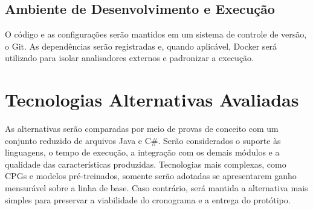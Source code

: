 \subsection{Ambiente de Desenvolvimento e Execução}

O código e as configurações serão mantidos em um sistema de controle de
versão, o Git. As dependências serão registradas e, quando aplicável, Docker será
utilizado para isolar analisadores externos e padronizar a execução.

\section{Tecnologias Alternativas Avaliadas}

As alternativas serão comparadas por meio de provas de conceito com um
conjunto reduzido de arquivos Java e C\#. Serão considerados o suporte às
linguagens, o tempo de execução, a integração com os demais módulos e a
qualidade das características produzidas. Tecnologias mais complexas, como CPGs e modelos pré-treinados, somente
serão adotadas se apresentarem ganho mensurável sobre a linha de base. Caso
contrário, será mantida a alternativa mais simples para preservar a
viabilidade do cronograma e a entrega do protótipo.
